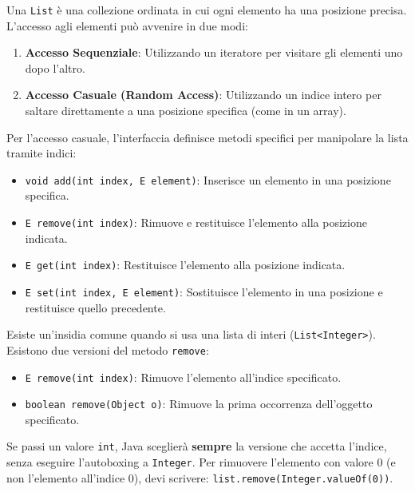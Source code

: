 Una \texttt{List} è una collezione ordinata in cui ogni elemento ha una posizione precisa. L'accesso agli elementi può avvenire in due modi:
\begin{enumerate}
    \item \textbf{Accesso Sequenziale}: Utilizzando un iteratore per visitare gli elementi uno dopo l'altro.
    \item \textbf{Accesso Casuale (Random Access)}: Utilizzando un indice intero per saltare direttamente a una posizione specifica (come in un array).
\end{enumerate}

\medskip

Per l'accesso casuale, l'interfaccia definisce metodi specifici per manipolare la lista tramite indici:
\begin{itemize}
    \item \texttt{void add(int index, E element)}: Inserisce un elemento in una posizione specifica.
    \item \texttt{E remove(int index)}: Rimuove e restituisce l'elemento alla posizione indicata.
    \item \texttt{E get(int index)}: Restituisce l'elemento alla posizione indicata.
    \item \texttt{E set(int index, E element)}: Sostituisce l'elemento in una posizione e restituisce quello precedente.
\end{itemize}

\begin{warningbox}
Esiste un'insidia comune quando si usa una lista di interi (\texttt{List<Integer>}). Esistono due versioni del metodo \texttt{remove}:
\begin{itemize}
    \item \texttt{E remove(int index)}: Rimuove l'elemento all'indice specificato.
    \item \texttt{boolean remove(Object o)}: Rimuove la prima occorrenza dell'oggetto specificato.
\end{itemize}
Se passi un valore \texttt{int}, Java sceglierà \textbf{sempre} la versione che accetta l'indice, senza eseguire l'autoboxing a \texttt{Integer}. Per rimuovere l'elemento con valore 0 (e non l'elemento all'indice 0), devi scrivere: \texttt{list.remove(Integer.valueOf(0))}.
\end{warningbox}

